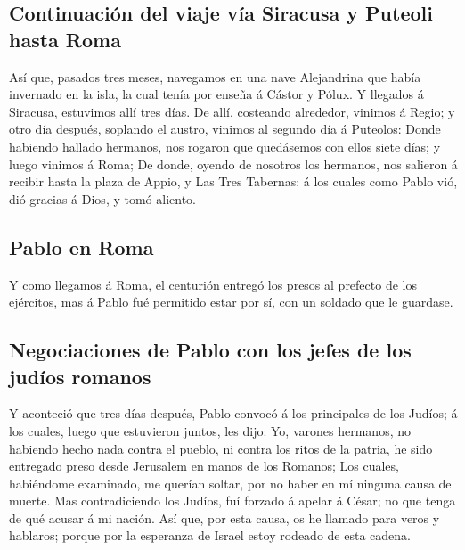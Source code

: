 \hypertarget{continuaciuxf3n-del-viaje-vuxeda-siracusa-y-puteoli-hasta-roma}{%
\subsection{Continuación del viaje vía Siracusa y Puteoli hasta
Roma}\label{continuaciuxf3n-del-viaje-vuxeda-siracusa-y-puteoli-hasta-roma}}

 Así que, pasados tres meses, navegamos en una nave
Alejandrina que había invernado en la isla, la cual tenía por enseña á
Cástor y Pólux.  Y llegados á Siracusa, estuvimos allí tres
días.  De allí, costeando alrededor, vinimos á Regio; y
otro día después, soplando el austro, vinimos al segundo día á Puteolos:
 Donde habiendo hallado hermanos, nos rogaron que
quedásemos con ellos siete días; y luego vinimos á Roma; 
De donde, oyendo de nosotros los hermanos, nos salieron á recibir hasta
la plaza de Appio, y Las Tres Tabernas: á los cuales como Pablo vió, dió
gracias á Dios, y tomó aliento.

\hypertarget{pablo-en-roma}{%
\subsection{Pablo en Roma}\label{pablo-en-roma}}

 Y como llegamos á Roma, el centurión entregó los presos al
prefecto de los ejércitos, mas á Pablo fué permitido estar por sí, con
un soldado que le guardase.

\hypertarget{negociaciones-de-pablo-con-los-jefes-de-los-juduxedos-romanos}{%
\subsection{Negociaciones de Pablo con los jefes de los judíos
romanos}\label{negociaciones-de-pablo-con-los-jefes-de-los-juduxedos-romanos}}

 Y aconteció que tres días después, Pablo convocó á los
principales de los Judíos; á los cuales, luego que estuvieron juntos,
les dijo: Yo, varones hermanos, no habiendo hecho nada contra el pueblo,
ni contra los ritos de la patria, he sido entregado preso desde
Jerusalem en manos de los Romanos;  Los cuales, habiéndome
examinado, me querían soltar, por no haber en mí ninguna causa de
muerte.  Mas contradiciendo los Judíos, fuí forzado á
apelar á César; no que tenga de qué acusar á mi nación. 
Así que, por esta causa, os he llamado para veros y hablaros; porque por
la esperanza de Israel estoy rodeado de esta cadena.

